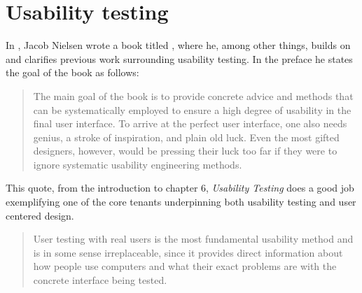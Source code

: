 




\section{Usability testing}

%

  In \citeyear{citeHeuristicsNielsenUsabilityEngineering}, Jacob Nielsen wrote a
  book titled %
  \cite{citeHeuristicsNielsenUsabilityEngineering}, where he, among other
  things, builds on and clarifies previous work surrounding usability testing.
  In the preface he states the goal of the book as follows:

  \begin{quote}
    The main goal of the book is to provide concrete advice and
    methods that can be systematically employed to ensure a high
    degree of usability in the final user interface. To arrive at the perfect
    user interface, one also needs genius, a stroke of inspiration, and
    plain old luck. Even the most gifted designers, however, would be
    pressing their luck too far if they were to ignore systematic usability
    engineering methods.
  \end{quote}

  This quote, from the introduction to chapter 6,
  \textit{Usability Testing}%
  \cite[p. 165]{citeHeuristicsNielsenUsabilityEngineering}
  does a good job exemplifying one of the core tenants underpinning both
  usability testing and user centered design.

  \begin{quote}
    User testing with real users is the most fundamental usability method and
    is in some sense irreplaceable, since it provides direct information about
    how people use computers and what their exact problems are with the
    concrete interface being tested.
  \end{quote}

